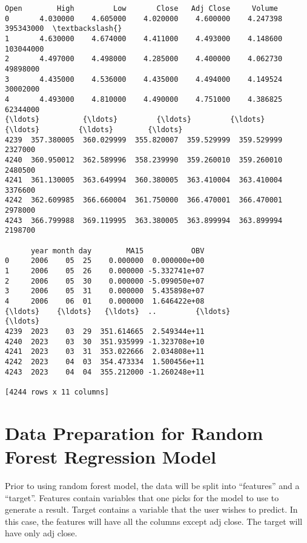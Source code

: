 \documentclass[11pt]{article}
\makeatletter
\newcommand{\boxspacing}{\kern\kvtcb@left@rule\kern\kvtcb@boxsep}
\newcommand{\prompt}[4]{
        {\ttfamily\llap{{\color{#2}[#3]:\hspace{3pt}#4}}\vspace{-\baselineskip}}
    }
\makeatother
\begin{document}
            \begin{tcolorbox}[breakable, size=fbox, boxrule=.5pt, pad at break*=1mm, opacityfill=0]
\prompt{Out}{outcolor}{9}{\boxspacing}
\begin{Verbatim}[commandchars=\\\{\}]
            Open        High         Low       Close   Adj Close     Volume
0       4.030000    4.605000    4.020000    4.600000    4.247398  395343000  \textbackslash{}
1       4.630000    4.674000    4.411000    4.493000    4.148600  103044000
2       4.497000    4.498000    4.285000    4.400000    4.062730   49898000
3       4.435000    4.536000    4.435000    4.494000    4.149524   30002000
4       4.493000    4.810000    4.490000    4.751000    4.386825   62344000
{\ldots}          {\ldots}         {\ldots}         {\ldots}         {\ldots}         {\ldots}        {\ldots}
4239  357.380005  360.029999  355.820007  359.529999  359.529999    2327000
4240  360.950012  362.589996  358.239990  359.260010  359.260010    2480500
4241  361.130005  363.649994  360.380005  363.410004  363.410004    3376600
4242  362.609985  366.660004  361.750000  366.470001  366.470001    2978000
4243  366.799988  369.119995  363.380005  363.899994  363.899994    2198700

      year month day        MA15           OBV
0     2006    05  25    0.000000  0.000000e+00
1     2006    05  26    0.000000 -5.332741e+07
2     2006    05  30    0.000000 -5.099050e+07
3     2006    05  31    0.000000  5.435898e+07
4     2006    06  01    0.000000  1.646422e+08
{\ldots}    {\ldots}   {\ldots}  ..         {\ldots}           {\ldots}
4239  2023    03  29  351.614665  2.549344e+11
4240  2023    03  30  351.935999 -1.323708e+10
4241  2023    03  31  353.022666  2.034808e+11
4242  2023    04  03  354.473334  1.500456e+11
4243  2023    04  04  355.212000 -1.260248e+11

[4244 rows x 11 columns]
\end{Verbatim}
\end{tcolorbox}
        
    \hypertarget{data-preparation-for-random-forest-regression-model}{%
\section{Data Preparation for Random Forest Regression
Model}\label{data-preparation-for-random-forest-regression-model}}

Prior to using random forest model, the data will be split into
``features'' and a ``target''. Features contain variables that one picks
for the model to use to generate a result. Target contains a variable
that the user wishes to predict. In this case, the features will have
all the columns except adj close. The target will have only adj close.
\end{document}
